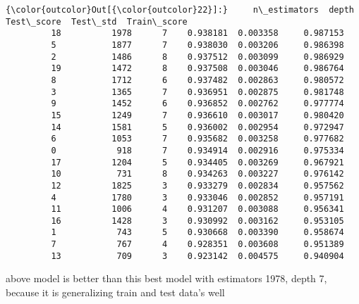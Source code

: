 \documentclass[11pt]{article}
\begin{document}
\begin{Verbatim}[commandchars=\\\{\}]
{\color{outcolor}Out[{\color{outcolor}22}]:}     n\_estimators  depth  Test\_score  Test\_std  Train\_score
         18          1978      7    0.938181  0.003358     0.987153
         5           1877      7    0.938030  0.003206     0.986398
         2           1486      8    0.937512  0.003099     0.986929
         19          1472      8    0.937508  0.003046     0.986764
         8           1712      6    0.937482  0.002863     0.980572
         3           1365      7    0.936951  0.002875     0.981748
         9           1452      6    0.936852  0.002762     0.977774
         15          1249      7    0.936610  0.003017     0.980420
         14          1581      5    0.936002  0.002954     0.972947
         6           1053      7    0.935682  0.003258     0.977682
         0            918      7    0.934914  0.002916     0.975334
         17          1204      5    0.934405  0.003269     0.967921
         10           731      8    0.934263  0.003227     0.976142
         12          1825      3    0.933279  0.002834     0.957562
         4           1780      3    0.933046  0.002852     0.957191
         11          1006      4    0.931207  0.003088     0.956341
         16          1428      3    0.930992  0.003162     0.953105
         1            743      5    0.930668  0.003390     0.958674
         7            767      4    0.928351  0.003608     0.951389
         13           709      3    0.923142  0.004575     0.940904
\end{Verbatim}
            
    above model is better than this best model with estimators 1978, depth
7, because it is generalizing train and test data's well
\end{document}
